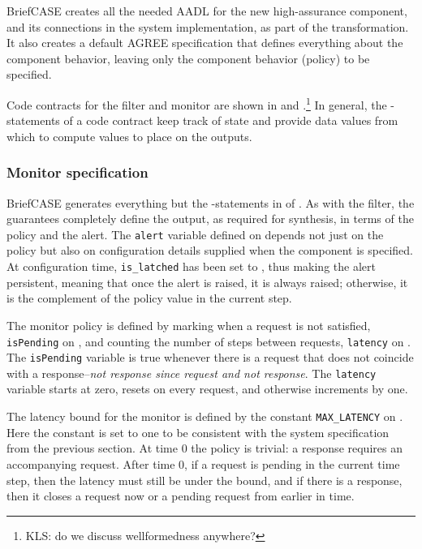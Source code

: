 BriefCASE creates all the needed AADL for the new high-assurance
component, and its connections in the system implementation, as part
of the transformation.  It also creates a default AGREE specification
that defines everything about the component behavior, leaving only the
component behavior (policy) to be specified.


Code contracts for the filter and monitor are shown in
 and .\footnote{KLS: do we discuss wellformedness anywhere?} In general, the
-statements of a code contract keep track of
state and provide data values from which to compute values to place on
the outputs.

\subsubsection{Monitor specification}
BriefCASE generates everything but the
-statements in  of
.  As with the filter, the guarantees
completely define the output, as required for synthesis, in terms of
the policy and the alert.  The
\texttt{alert} variable defined on  depends
not just on the policy but also on configuration details supplied when
the component is specified.  At configuration
time, \texttt{is\_latched} has been set to , thus making
the alert persistent, meaning that once the alert is raised, it is
always raised; otherwise, it is the complement of the policy value in
the current step.

The monitor policy is defined by marking when a request is not
satisfied, \texttt{isPending} on , and
counting the number of steps between requests, \texttt{latency} on
.  The \texttt{isPending} variable is true
whenever there is a request that does not coincide with a
response--\emph{not response since request and not response}.  The
\texttt{latency} variable starts at zero, resets on every request, and
otherwise increments by one.

The latency bound for the monitor is defined by the constant
\texttt{MAX\_LATENCY} on .  Here the constant
is set to one to be consistent with the system specification from the
previous section.  At time 0 the policy is trivial: a response
requires an accompanying request.  After time 0, if a request is
pending in the current time step, then the latency must still be under
the bound, and if there is a response, then it closes a request now or
a pending request from earlier in time.

